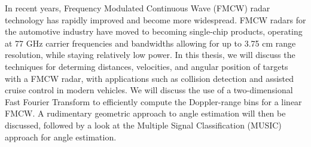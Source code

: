 In recent years, Frequency Modulated Continuous Wave (FMCW) radar technology has
rapidly improved and become more widespread. FMCW radars for the automotive
industry have moved to becoming single-chip products, operating at 77 GHz
carrier frequencies and bandwidths allowing for up to 3.75 cm range resolution,
while staying relatively low power. In this thesis, we will discuss the
techniques for determing distances, velocities, and angular position of targets
with a FMCW radar, with applications such as collision detection and assisted
cruise control in modern vehicles. We will discuss the use of a two-dimensional
Fast Fourier Transform to efficiently compute the Doppler-range bins for a
linear FMCW. A rudimentary geometric approach to angle estimation will then be
discussed, followed by a look at the Multiple Signal Classification (MUSIC)
approach for angle estimation.
